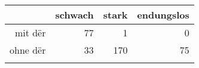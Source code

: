 \begin{tabular}{rrrr}
  \lsptoprule
 & schwach & stark & endungslos \\ 
  \midrule
mit dër & 77 & 1 & 0 \\ 
  ohne dër & 33 & 170 & 75 \\ 
   \lspbottomrule
\end{tabular}
